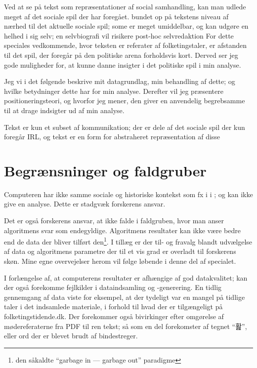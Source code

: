
Ved at se på tekst som repræsentationer af social samhandling, kan man udlede meget af det sociale spil der har foregået.
bundet op på tekstens niveau af nærhed til det aktuelle sociale spil; some er meget umiddelbar, og kan udgøre en helhed i sig selv; en selvbiografi vil risikere post-hoc selvredaktion 
For dette speciales vedkommende, hvor teksten er referater af folketingstaler, er afstanden til det spil, der foregår på den politiske arena forholdsvis kort.
Derved ser jeg gode muligheder for, at kunne danne insigter i det politiske spil i min analyse.

 Jeg vi i det følgende beskrive mit datagrundlag, min behandling af dette; og hvilke betydninger dette har for min analyse.
Derefter vil jeg præsentere positioneringsteori, og hvorfor jeg mener, den giver en anvendelig begrebsamme til at drage indsigter ud af min analyse.


Tekst er kun et subset af kommunikation; der er dele af det sociale spil der kun foregår IRL, og tekst er en form for abstraheret repræsentation af disse \autocite[s. 22]{evansMachineTranslationMining2016}

\section{Begrænsninger og faldgruber}

Computeren har ikke samme sociale og historiske kontekst som fx i \citeauthor{juulDiskurserOmUngdom2013} i ; og kan ikke give en analyse.
Dette er stadgvæk forskerens ansvar.

Det er også forskerens ansvar, at ikke falde i faldgruben, hvor man anser algoritmens svar som endegyldige.
Algoritmens resultater kan ikke være bedre end de data der bliver tilført den\footnote{den såkaldte “garbage in — garbage out” paradigme}.
I tillæg er der til- og fravalg blandt udvælgelse af data og algoritmens parametre der til et vis grad er overladt til forskerens skøn.
Mine egne overvejelser herom vil følge løbende i denne del af specialet.

I forlængelse af, at computerens resultater er afhængige af god datakvalitet; kan der også forekomme fejlkilder i dataindsamling og -generering.
En tidlig gennemgang af data viste for eksempel, at der tydeligt var en mangel på tidlige taler i det indsamlede materiale, i forhold til hvad der er tilgængeligt på folketingstidende.dk.
Der forekommer også bivirkinger efter omgørelse af mødereferaterne fra PDF til ren tekst; så som en del forekomster af tegnet “홢”, eller ord der er blevet brudt af bindestreger. 


